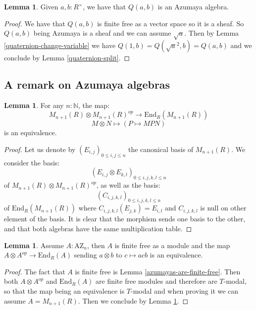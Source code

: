 \documentclass[10pt,a4paper]{article}
\theoremstyle{definition}
\newtheorem{lemma}[theorem]{Lemma}
\newcommand{\AZ}{\mathrm{AZ}}
\newcommand{\N}{\mathbb{N}}
\begin{document}
\begin{lemma}
Given $a,b:R^\times$, we have that $Q(a,b)$ is an Azumaya algebra. 
\end{lemma}

\begin{proof}
We have that $Q(a,b)$ is finite free as a vector space so it is a sheaf. So $Q(a,b)$ being Azumaya is a sheaf and we can assume $\sqrt{a}$. Then by Lemma \ref{quaternion-change-variable} we have $Q(1,b) = Q(\sqrt{a}^2,b) = Q(a,b)$ and we conclude by Lemma \ref{quaternion-split}.
\end{proof}


\subsection{A remark on Azumaya algebras}

\begin{lemma}\label{MnR-endomorphism-multiplication}
For any $n:\N$, the map:
\[M_{n+1}(R)\otimes M_{n+1}(R)^{op}\to \mathrm{End}_R(M_{n+1}(R))\]
\[M\otimes N\mapsto (P\mapsto MPN)\]
is an equivalence.
\end{lemma}

\begin{proof}
Let us denote by $(E_{i,j})_{0\leq i,j\leq n}$ the canonical basis of $M_{n+1}(R)$. We consider the basis: 
\[(E_{i,j}\otimes E_{k,l})_{0\leq i,j,k,l\leq n}\] 
of $M_{n+1}(R)\otimes M_{n+1}(R)^{op}$, as well as the basis:
\[(C_{i,j,k,l})_{0\leq i,j,k,l\leq n}\] 
of $\mathrm{End}_R(M_{n+1}(R))$ where $C_{i,j,k,l}(E_{j,k}) = E_{i,l}$ and $C_{i,j,k,l}$ is null on other element of the basis. It is clear that the morphism sends one basis to the other, and that both algebras have the same multiplication table. 
\end{proof}

\begin{lemma}
Assume $A:\AZ_n$, then $A$ is finite free as a module and the map $A\otimes A^{op}\to \mathrm{End}_R(A)$ sending $a\otimes b$ to $c\mapsto acb$ is an equivalence.
\end{lemma}

\begin{proof}
The fact that $A$ is finite free is Lemma \ref{azumayas-are-finite-free}. Then both $A\otimes A^{op}$ and $\mathrm{End}_R(A)$ are finite free modules and therefore are $T$-modal, so that the map being an equivalence is $T$-modal and when proving it we can assume $A=M_{n+1}(R)$. Then we conclude by Lemma \ref{MnR-endomorphism-multiplication}.
\end{proof}
\end{document}
